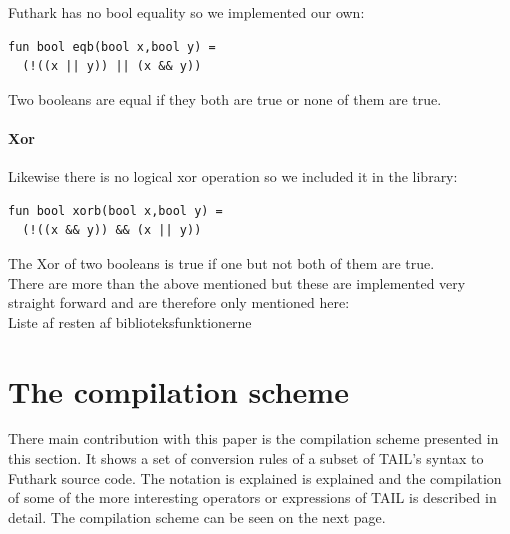 \documentclass[11pt]{article}
\begin{document}
Futhark has no bool equality so we implemented our own:

\begin{lstlisting}[language=Futhark]
fun bool eqb(bool x,bool y) =
  (!((x || y)) || (x && y))
\end{lstlisting}

Two booleans are equal if they both are true or none of them are true.
\paragraph{Xor} Likewise there is no logical xor operation so we included it in the library:

\begin{lstlisting}[language=Futhark]
fun bool xorb(bool x,bool y) =
  (!((x && y)) && (x || y))
\end{lstlisting}

The Xor of two booleans is true if one but not both of them are true.
\\

There are more than the above mentioned but these are implemented very straight forward and are therefore only mentioned here: \\

Liste af resten af biblioteksfunktionerne


\section{The compilation scheme}
\label{sec:scheme}
There main contribution with this paper is the compilation scheme presented in this section.
It shows a set of conversion rules of a subset of TAIL's syntax to Futhark source code.
The notation is explained is explained and the compilation of some of the more interesting operators or expressions of TAIL is described in detail. The compilation scheme can be seen on the next page.\\
\end{document}
